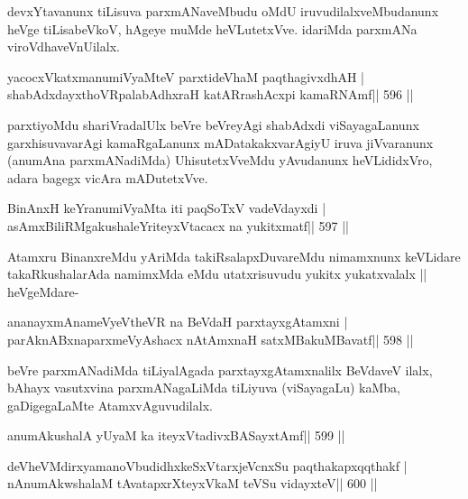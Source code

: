 \begin{artha}
devxYtavanunx tiLisuva parxmANaveMbudu oMdU iruvudilalxveMbudanunx heVge tiLisabeVkoV, hAgeye muMde heVLutetxVve. idariMda parxmANa viroVdhaveVnUilalx.
\end{artha}

\begin{shl}
yacocxVkatxmanumiVyaMteV parxtideVhaM paqthagivxdhAH |
shabAdxdayxthoVRpalabAdhxraH katARrashAcxpi kamaRNAmf\hfill || 596 ||
\end{shl}

\begin{artha}
parxtiyoMdu shariVradalUlx beVre beVreyAgi shabAdxdi viSayagaLanunx
garxhisuvavarAgi kamaRgaLanunx mADatakakxvarAgiyU iruva jiVvaranunx
(anumAna parxmANadiMda) UhisutetxVveMdu yAvudanunx heVLididxVro, adara
bagegx vicAra mADutetxVve.
\end{artha}

\begin{shl}
BinAnxH keYranumiVyaMta iti paqSoTxV vadeVdayxdi |
asAmxBiliRMgakushaleYriteyxVtacacx na yukitxmatf\hfill || 597 ||
\end{shl}

\begin{artha}
Atamxru BinanxreMdu yAriMda takiRsalapxDuvareMdu nimamxnunx keVLidare
takaRkushalarAda namimxMda eMdu utatxrisuvudu yukitx yukatxvalalx ||
heVgeMdare-
\end{artha}

\begin{shl}
ananayxmAnameVyeV\s theVR na BeVdaH parxtayxgAtamxni |
parAknABxnaparxmeVyAshacx nA\s\s tAmxnaH satxMBakuMBavatf\hfill || 598 ||
\end{shl}

\begin{artha}
beVre parxmANadiMda tiLiyalAgada parxtayxgAtamxnalilx BeVdaveV ilalx, bAhayx vasutxvina parxmANagaLiMda tiLiyuva (viSayagaLu) kaMba, gaDigegaLaMte AtamxvAguvudilalx.
\end{artha}



\begin{shl}
anumAkushalA yUyaM ka iteyxVtadivxBASayxtAmf\hfill || 599 ||
\end{shl}

\begin{shl}
deVheVMdirxyamanoVbudidhxkeSxVtarxjeVcnxSu paqthakapxqqthakf |
nAnumAkwshalaM tAvatapxrXteyxVkaM teVSu vidayxteV\hfill || 600 ||
\end{shl}

